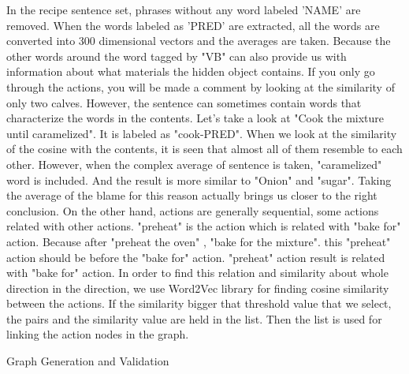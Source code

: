 In the recipe sentence set, phrases without any word labeled 'NAME' are removed. When the words labeled as 'PRED' are extracted, all the words are converted into 300 dimensional vectors and the averages are taken. Because the other words around the word tagged by "VB" can also provide us with information about what materials the hidden object contains. If you only go through the actions, you will be made a comment by looking at the similarity of only two calves. However, the sentence can sometimes contain words that characterize the words in the contents. Let's take a look at "Cook the mixture until caramelized". It is labeled as "cook-PRED". When we look at the similarity of the cosine with the contents, it is seen that almost all of them resemble to each other. However, when the complex average of sentence is taken, "caramelized" word is included. And the result is more similar to "Onion" and "sugar". Taking the average of the blame for this reason actually brings us closer to the right conclusion. On the other hand, actions are generally sequential, some actions related with other actions. "preheat" is the action which is related with "bake for" action. Because after "preheat the oven" , "bake for the mixture". this "preheat" action should be before the "bake for" action. "preheat" action  result is related with "bake for" action. In order to find this relation and similarity about whole direction in the direction, we use Word2Vec library for finding cosine similarity between the actions. If the similarity bigger that threshold value that we select, the pairs and the similarity value are held  in the list. Then the list is used for linking the action nodes in the graph. 


\begin{algorithm}
\caption{Graph Generation and Validation}
\label{alg:generateGraph}
\end{algorithm}
        


